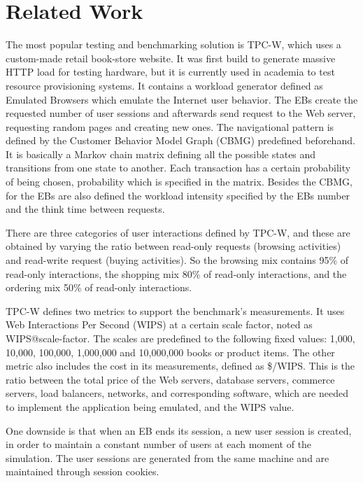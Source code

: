 \chapter{Related Work}
\label{chapter:chapter2}

The most popular testing and benchmarking solution is TPC-W, which uses a custom-made retail book-store website. It was first build to generate massive HTTP load for testing hardware, but it is currently used in academia to test resource provisioning systems. It contains a workload generator defined as Emulated Browsers which emulate the Internet user behavior. The EBs create the requested number of user sessions and afterwards send request to the Web server, requesting random pages and creating new ones. The navigational pattern is defined by the Customer Behavior Model Graph (CBMG) predefined beforehand. It is basically a Markov chain matrix defining all the possible states and transitions from one state to another. Each transaction has a certain probability of being chosen, probability which is specified in the matrix. Besides the CBMG, for the EBs are also defined the workload intensity specified by the EBs number and the think time between requests.

There are three categories of user interactions defined by TPC-W, and these are obtained by varying the ratio between read-only requests (browsing activities) and read-write request (buying activities). So the browsing mix contains 95\% of read-only interactions, the shopping mix 80\% of read-only interactions, and the  ordering mix 50\% of  read-only interactions.

TPC-W defines two metrics to support the benchmark's measurements. It uses Web Interactions Per Second (WIPS) at a certain scale factor, noted as WIPS@scale-factor. The scales are predefined to the following fixed values: 1,000, 10,000, 100,000, 1,000,000 and 10,000,000 books or product items. The other metric also includes the cost in its measurements, defined as \$/WIPS. This is the ratio between the total price of the Web servers, database servers, commerce servers, load balancers, networks, and corresponding software, which are needed to implement the application being emulated, and the WIPS value. 

One downside is that when an EB ends its session, a new user session is created, in order to maintain a constant number of users at each moment of the simulation. The user sessions are generated from the same machine and are maintained through session cookies.

